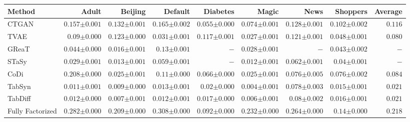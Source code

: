 \begin{tabular}{lrrrrrrr|r}
    \toprule[0.8pt]
     \textbf{Method} & \textbf{Adult} & \textbf{Beijing} & \textbf{Default} & \textbf{Diabetes} & \textbf{Magic} & \textbf{News} & \textbf{Shoppers} & \textbf{Average} \\
    \midrule 
    CTGAN & $0.157${\tiny${\pm 0.001}$} & $0.132${\tiny${\pm 0.001}$} & $0.165${\tiny${\pm 0.002}$} & $0.055${\tiny${\pm 0.000}$} & $0.074${\tiny${\pm 0.001}$} & $0.128${\tiny${\pm 0.001}$} & $0.102${\tiny${\pm 0.002}$} & $0.116$ \\
    TVAE & $0.09${\tiny${\pm 0.000}$} & $0.123${\tiny${\pm 0.000}$} & $0.031${\tiny${\pm 0.001}$} & $0.117${\tiny${\pm 0.001}$} & $0.027${\tiny${\pm 0.001}$} & $0.121${\tiny${\pm 0.001}$} & $0.048${\tiny${\pm 0.001}$} & $0.080$ \\
    GReaT & $0.044${\tiny${\pm 0.000}$} & $0.016${\tiny${\pm 0.001}$} & $0.13${\tiny${\pm 0.001}$} & $-$ & $0.028${\tiny${\pm 0.001}$} & $-$ & $0.043${\tiny${\pm 0.002}$} & $-$ \\
    STaSy & $0.029${\tiny${\pm 0.001}$} & $0.013${\tiny${\pm 0.001}$} & $0.059${\tiny${\pm 0.001}$} & $-$ & $0.012${\tiny${\pm 0.001}$} & $0.062${\tiny${\pm 0.001}$} & $0.04${\tiny${\pm 0.001}$} & $-$ \\
    CoDi & $0.208${\tiny${\pm 0.000}$} & $0.025${\tiny${\pm 0.001}$} & $0.11${\tiny${\pm 0.000}$} & $0.066${\tiny${\pm 0.000}$} & $0.025${\tiny${\pm 0.001}$} & $0.076${\tiny${\pm 0.005}$} & $0.076${\tiny${\pm 0.002}$} & $0.084$ \\
    TabSyn & $0.011${\tiny${\pm 0.001}$} & $0.009${\tiny${\pm 0.000}$} & $0.013${\tiny${\pm 0.001}$} & $0.02${\tiny${\pm 0.000}$} & $0.004${\tiny${\pm 0.001}$} & $0.078${\tiny${\pm 0.003}$} & $0.015${\tiny${\pm 0.001}$} & $0.021$ \\
    TabDiff & $0.012${\tiny${\pm 0.000}$} & $0.007${\tiny${\pm 0.001}$} & $0.012${\tiny${\pm 0.001}$} & $0.017${\tiny${\pm 0.000}$} & $0.006${\tiny${\pm 0.001}$} & $0.08${\tiny${\pm 0.002}$} & $0.016${\tiny${\pm 0.001}$} & $0.021$ \\
    \midrule
    Fully Factorized & $0.282${\tiny${\pm 0.000}$} & $0.209${\tiny${\pm 0.000}$} & $0.308${\tiny${\pm 0.000}$} & $0.092${\tiny${\pm 0.000}$} & $0.232${\tiny${\pm 0.000}$} & $0.264${\tiny${\pm 0.000}$} & $0.14${\tiny${\pm 0.000}$} & $0.218$ \\

\end{tabular}
